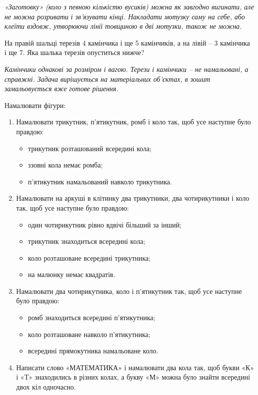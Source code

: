 \emph{
«Заготовку» (коло з певною кількістю вусиків) можна як завгодно вигинати,
але не можна розривати і зв'язувати кінці.
Накладати мотузку саму на себе, або клеїти вздовж,
утворюючи лінії товщиною в дві мотузки, також не можна.
}


\problem
На правій шальці терезів 4 камінчика і ще 5 камінчиків,
а на лівій – 3 камінчика і ще 7.
Яка шалька терезів опуститься нижче? 

\emph{
Камінчики однакові за розміром і вагою.
Терези і камінчики – не намальовані, а справжні.
Задача вирішується на матеріальних об’єктах,
в зошит замальовується вже готове рішення.
}


\problem
Намалювати фігури:
\begin{enumerate}
    \item Намалювати трикутник, п'ятикутник, ромб і коло так,
    щоб усе наступне було правдою:
    \begin{itemize}
        \item трикутник розташований всередині кола;
        \item ззовні кола немає ромба;
        \item п'ятикутник намальований навколо трикутника.
    \end{itemize}
    \item Намалювати на аркуші в клітинку два трикутники,
    два чотирикутники і коло так, щоб усе наступне було правдою:
    \begin{itemize}
        \item один чотирикутник рівно вдвічі більший за інший;
        \item трикутник знаходиться всередині кола;
        \item коло розташоване всередині трикутника;
        \item на малюнку немає квадратів.
    \end{itemize}
    \item Намалювати два чотирикутника, коло і п'ятикутник так,
    щоб усе наступне було правдою:
    \begin{itemize}
        \item ромб знаходиться всередині п'ятикутника;
        \item коло розташоване навколо п'ятикутника;
        \item всередині прямокутника намальоване коло.
    \end{itemize}
    \item Написати слово «МАТЕМАТИКА» і намалювати два кола так,
    щоб букви «К» і «Т» знаходились в різних колах,
    а букву «М» можна було знайти всередині двох кіл одночасно.
\end{enumerate}


